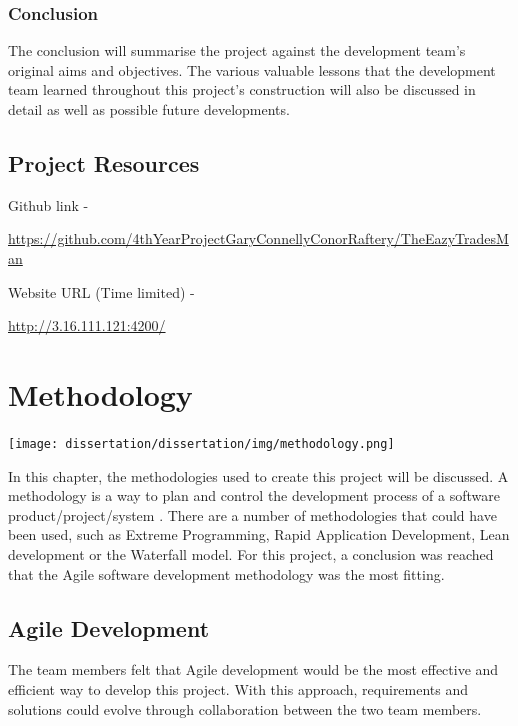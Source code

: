 \subsection{Conclusion}
\label{sec:IntroductionConclusion}
The conclusion will summarise the project against the development team's original aims and objectives. The various valuable lessons that the development team learned throughout this project's construction will also be discussed in detail as well as possible future developments. 



\section{Project Resources}
\label{sec:IntroductionProjectResources}

Github link - 
\bigskip

\href{https://github.com/4thYearProjectGaryConnellyConorRaftery/TheEazyTradesMan}{https://github.com/4thYearProjectGaryConnellyConorRaftery/TheEazyTradesMan}

\bigskip

\noindent Website URL (Time limited) - 
\bigskip

\href{http://3.16.111.121:4200/}{http://3.16.111.121:4200/}

\chapter{Methodology}
\label{sec:Methodology}

\bigskip

\texttt{[image: dissertation/dissertation/img/methodology.png]}

\bigskip

In this chapter, the methodologies used to create this project will be discussed. A methodology is a way to plan and control the development process of a software product/project/system \cite{hardgrave2003investigating}. There are a number of methodologies that could have been used, such as Extreme Programming, Rapid Application Development, Lean development or the Waterfall model. For this project, a conclusion was reached that the Agile software development methodology was the most fitting.
\section{Agile Development}
The team members felt that Agile development would be the most effective and efficient way to develop this project. With this approach, requirements and solutions could evolve through collaboration between the two team members.
\bigskip

